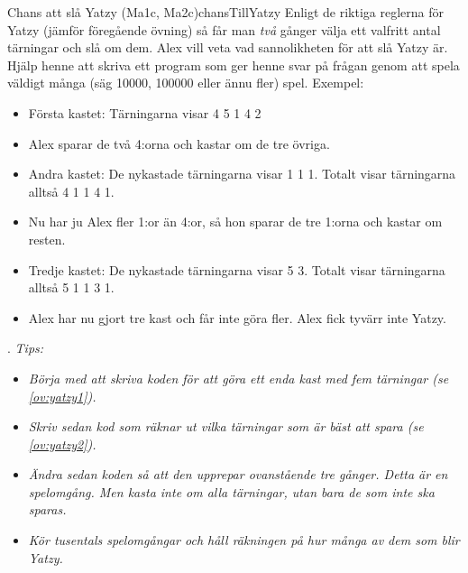 \begin{matteovnings}{Chans att slå Yatzy (Ma1c, Ma2c)}{chansTillYatzy}
Enligt de riktiga reglerna för Yatzy (jämför föregående övning) så får man \emph{två} gånger välja ett valfritt antal tärningar och slå om dem. Alex vill veta vad sannolikheten för att slå Yatzy är. Hjälp henne att skriva ett program som ger henne svar på frågan genom att spela väldigt många (säg 10000, 100000 eller ännu fler) spel.
\newline
\newline
Exempel:
\begin{itemize}
\item Första kastet: Tärningarna visar 4 5 1 4 2
\item Alex sparar de två 4:orna och kastar om de tre övriga.
\item Andra kastet: De nykastade tärningarna visar 1 1 1. Totalt visar tärningarna alltså 4 1 1 4 1.
\item Nu har ju Alex fler 1:or än 4:or, så hon sparar de tre 1:orna och kastar om resten.
\item Tredje kastet: De nykastade tärningarna visar 5 3. Totalt visar tärningarna alltså 5 1 1 3 1.
\item Alex har nu gjort tre kast och får inte göra fler. Alex fick tyvärr inte Yatzy.
\end{itemize}
{\color{white}.}
\newline
\emph{Tips:}
\begin{itemize}
\item \emph{Börja med att skriva koden för att göra ett enda kast med fem tärningar (se \autoref{ov:yatzy1}).}
\item \emph{Skriv sedan kod som räknar ut vilka tärningar som är bäst att spara (se \autoref{ov:yatzy2}).}
\item\emph{Ändra sedan koden så att den upprepar ovanstående tre gånger. Detta är en spelomgång. Men kasta inte om alla tärningar, utan bara de som inte ska sparas.}
\item\emph{Kör tusentals spelomgångar och håll räkningen på hur många av dem som blir Yatzy.}
\end{itemize}
\end{matteovnings}



